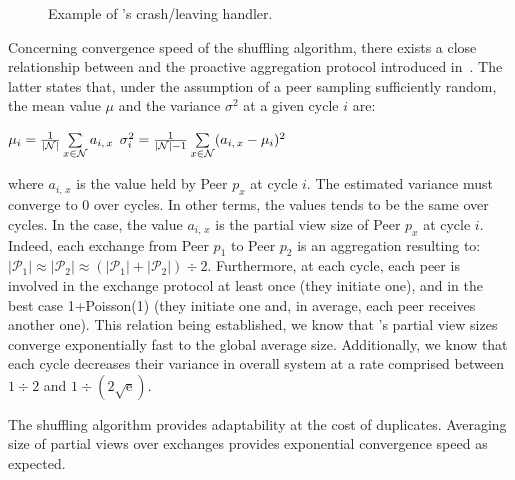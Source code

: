 \begin{figure*}
  \centering
  \hspace{10pt}
  \hspace{10pt}
  \caption{\label{fig:crashexample}Example of \SPRAY's crash/leaving
    handler. }
\end{figure*}

Concerning convergence speed of the shuffling algorithm, there exists
a close relationship between \SPRAY and the proactive aggregation
protocol introduced
in~\cite{jelasity2004epidemic,montresor2004robust}. The latter states
that, under the assumption of a peer sampling sufficiently random, the
mean value $\mu$ and the variance $\sigma^2$ at a given cycle $i$ are:
\begin{center}
  $\mu_i = {1\over{|\mathcal{N}|}} \sum\limits_{x \in \mathcal{N}} a_{i,\,x}$
  \hfill
  $\sigma^2_i = {1\over{|\mathcal{N}|-1}}\sum\limits_{x \in \mathcal{N}}
  (a_{i,\,x} - \mu_i)^2$
\end{center}
where $a_{i,\,x}$ is the value held by Peer $p_x$ at cycle $i$. The estimated
variance must converge to $0$ over cycles. In other terms, the values tends to
be the same over cycles. In the \SPRAY case, the value $a_{i,\,x}$ is the
partial view size of Peer $p_x$ at cycle $i$. Indeed, each exchange from Peer
$p_1$ to Peer $p_2$ is an aggregation resulting to:
$|\mathcal{P}_1|\approx|\mathcal{P}_2|\approx{(|\mathcal{P}_1| +
  |\mathcal{P}_2|) \div 2}$.
Furthermore, at each cycle, each peer is involved in the exchange protocol at
least once (they initiate one), and in the best case 1+Poisson(1) (they
initiate one and, in average, each peer receives another one). This relation
being established, we know that \SPRAY's partial view sizes converge
exponentially fast to the global average size. Additionally, we know that each
cycle decreases their variance in overall system at a rate comprised between
${1\div 2}$ and $1\div ({2\sqrt{\text{e}}})$.

The shuffling algorithm provides adaptability at the cost of
duplicates. Averaging size of partial views over exchanges provides
exponential convergence speed as expected.

